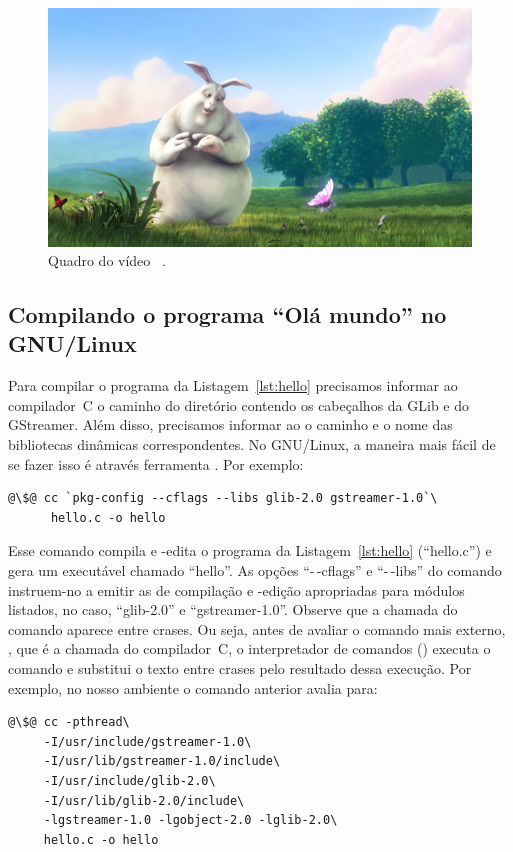 \documentclass{SBCbookchapter}
\begin{document}
\begin{figure}[H]
  \centering
  \includegraphics[scale=.115]{media/frame}
  \caption{Quadro do vídeo ~\cite{bunny}.}
  \label{fig:bunny}
\end{figure}


\subsection*{Compilando o programa ``Olá mundo'' no GNU/Linux}

Para compilar o programa da Listagem~\ref{lst:hello} precisamos informar ao
compilador~C o caminho do diretório contendo os cabeçalhos da GLib e do
GStreamer.  Além disso, precisamos informar ao  o caminho e o
nome das bibliotecas dinâmicas correspondentes.  No GNU/Linux, a maneira
mais fácil de se fazer isso é através ferramenta .  Por
exemplo:
\begin{lstlisting}[style=command]
@\$@ cc `pkg-config --cflags --libs glib-2.0 gstreamer-1.0`\
      hello.c -o hello
\end{lstlisting}

Esse comando compila e -edita o programa da
Listagem~\ref{lst:hello} (``hello.c'') e gera um executável chamado
``hello''.  As opções ``-\,-cflags'' e ``-\,-libs'' do comando
 instruem-no a emitir as  de compilação e
\en{link}-edição apropriadas para módulos listados, no caso, ``glib-2.0'' e
``gstreamer-1.0''.  Observe que a chamada do comando \en{pkg-config} aparece
entre crases.  Ou seja, antes de avaliar o comando mais externo, \en{cc},
que é a chamada do compilador~C, o interpretador de comandos (\en{shell})
executa o comando \en{pkg-config} e substitui o texto entre crases pelo
resultado dessa execução.  Por exemplo, no nosso ambiente o comando anterior
avalia para:
\begin{lstlisting}[style=command]
@\$@ cc -pthread\
     -I/usr/include/gstreamer-1.0\
     -I/usr/lib/gstreamer-1.0/include\
     -I/usr/include/glib-2.0\
     -I/usr/lib/glib-2.0/include\
     -lgstreamer-1.0 -lgobject-2.0 -lglib-2.0\
     hello.c -o hello
\end{lstlisting}
\end{document}
